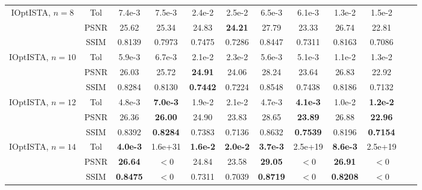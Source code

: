 \documentclass{article}
\begin{document}
\begin{table*}[thp]
\begin{center}
\begin{tabular}{c|c|c c | cc | cc| cc cc }
\multirow{3}{*}{IOptISTA, $n=8$} & Tol & 7.4e-3 & 7.5e-3 &  2.4e-2 & 2.5e-2 & 6.5e-3 & 6.1e-3& 1.3e-2 & 1.5e-2\\
& PSNR & 25.62 & 25.34 &  24.83 & \textbf{24.21}& 27.79 & 23.33& 26.74 & 22.81\\
& SSIM & 0.8139 & 0.7973 &  0.7475 & 0.7286 & 0.8447 & 0.7311& 0.8163 & 0.7086\\ \hline
\multirow{3}{*}{IOptISTA, $n=10$} & Tol & 5.9e-3 & 6.7e-3 &  2.1e-2 & 2.3e-2& 5.6e-3 & 5.1e-3& 1.1e-2 & 1.3e-2\\
& PSNR &26.03 & 25.72&  \textbf{24.91} & 24.06 & 28.24 & 23.64& 26.83 & 22.92\\
& SSIM &0.8284 & 0.8130 &  \textbf{0.7442} & 0.7224 & 0.8548 &0.7438 & 0.8186 & 0.7132\\ \hline
\multirow{3}{*}{IOptISTA, $n=12$} & Tol & 4.8e-3 & \textbf{7.0e-3}&  1.9e-2 & 2.1e-2& 4.7e-3 & \textbf{4.1e-3}& 1.0e-2 & \textbf{1.2e-2}\\
& PSNR &26.36 & \textbf{26.00}&  24.90 & 23.83 & 28.65 & \textbf{23.89}& 26.88 & \textbf{22.96}\\
& SSIM &0.8392 & \textbf{0.8284}&  0.7383 & 0.7136 & 0.8632 & \textbf{0.7539}& 0.8196 & \textbf{0.7154}\\ \hline
\multirow{3}{*}{IOptISTA, $n=14$} & Tol & \textbf{4.0e-3} & 1.6e+31&  \textbf{1.6e-2} & \textbf{2.0e-2} & \textbf{3.7e-3} & 2.5e+19& \textbf{8.6e-3} & 2.5e+19\\
& PSNR &\textbf{26.64} & $<0$&  24.84 & 23.58& \textbf{29.05} & $<0$& \textbf{26.91} & $<0$\\
& SSIM &\textbf{0.8475} & $<0$&  0.7311 & 0.7039& \textbf{0.8719} & $<0$& \textbf{0.8208} & $<0$\\ \hline
\end{tabular}
\end{center}
\end{table*}
\end{document}
